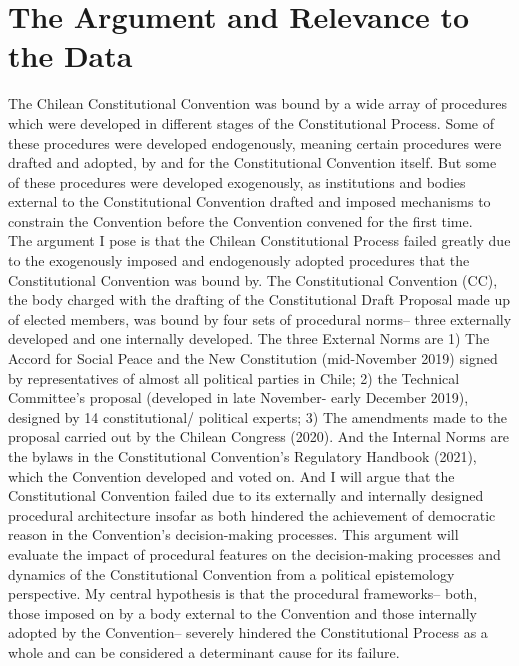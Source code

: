 \documentclass[
  man]{apa6}
\begin{document}
\hypertarget{the-argument-and-relevance-to-the-data}{%
\section{The Argument and Relevance to the Data}\label{the-argument-and-relevance-to-the-data}}

The Chilean Constitutional Convention was bound by a wide array of procedures which were developed in different stages of the Constitutional Process. Some of these procedures were developed endogenously, meaning certain procedures were drafted and adopted, by and for the Constitutional Convention itself. But some of these procedures were developed exogenously, as institutions and bodies external to the Constitutional Convention drafted and imposed mechanisms to constrain the Convention before the Convention convened for the first time.\\
The argument I pose is that the Chilean Constitutional Process failed greatly due to the exogenously imposed and endogenously adopted procedures that the Constitutional Convention was bound by. The Constitutional Convention (CC), the body charged with the drafting of the Constitutional Draft Proposal made up of elected members, was bound by four sets of procedural norms-- three externally developed and one internally developed. The three External Norms are 1) The Accord for Social Peace and the New Constitution (mid-November 2019) signed by representatives of almost all political parties in Chile; 2) the Technical Committee's proposal (developed in late November- early December 2019), designed by 14 constitutional/ political experts; 3) The amendments made to the proposal carried out by the Chilean Congress (2020). And the Internal Norms are the bylaws in the Constitutional Convention's Regulatory Handbook (2021), which the Convention developed and voted on.
And I will argue that the Constitutional Convention failed due to its externally and internally designed procedural architecture insofar as both hindered the achievement of democratic reason in the Convention's decision-making processes. This argument will evaluate the impact of procedural features on the decision-making processes and dynamics of the Constitutional Convention from a political epistemology perspective. My central hypothesis is that the procedural frameworks-- both, those imposed on by a body external to the Convention and those internally adopted by the Convention-- severely hindered the Constitutional Process as a whole and can be considered a determinant cause for its failure.
\end{document}
